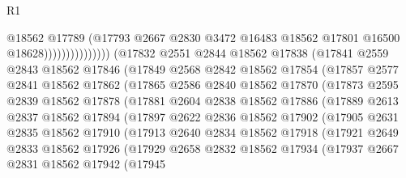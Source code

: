 \begin{lexlean}{R1}
\begin{coremodule}
                                    @18562
                                    @17789
                                    (@17793
                                      @2667
                                      @2830
                                      @3472
                                      @16483
                                      @18562
                                      @17801
                                      @16500
                                      @18628)))))))))))))))
        (@17832
          @2551
          @2844
          @18562
          @17838
          (@17841
            @2559
            @2843
            @18562
            @17846
            (@17849
              @2568
              @2842
              @18562
              @17854
              (@17857
                @2577
                @2841
                @18562
                @17862
                (@17865
                  @2586
                  @2840
                  @18562
                  @17870
                  (@17873
                    @2595
                    @2839
                    @18562
                    @17878
                    (@17881
                      @2604
                      @2838
                      @18562
                      @17886
                      (@17889
                        @2613
                        @2837
                        @18562
                        @17894
                        (@17897
                          @2622
                          @2836
                          @18562
                          @17902
                          (@17905
                            @2631
                            @2835
                            @18562
                            @17910
                            (@17913
                              @2640
                              @2834
                              @18562
                              @17918
                              (@17921
                                @2649
                                @2833
                                @18562
                                @17926
                                (@17929
                                  @2658
                                  @2832
                                  @18562
                                  @17934
                                  (@17937
                                    @2667
                                    @2831
                                    @18562
                                    @17942
                                    (@17945

\end{coremodule}
\end{lexlean}
